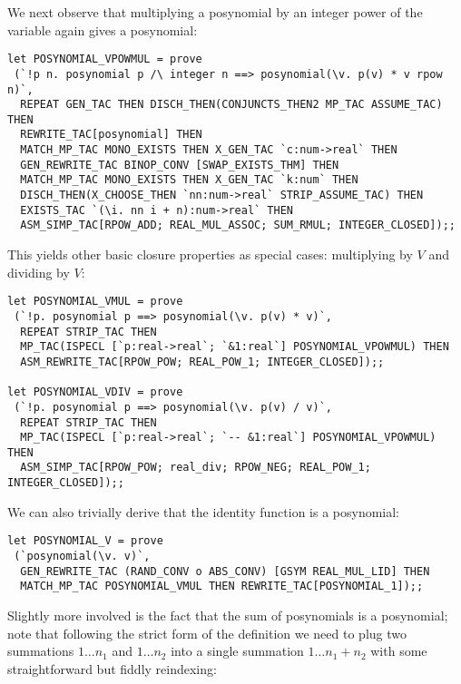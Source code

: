 \documentclass[10pt]{article}
\theoremstyle{definition}
\theoremstyle{remark}
\numberwithin{equation}{section}
\begin{document}
We next observe that multiplying a posynomial by an integer power of the
variable again gives a posynomial:

\begin{scriptsize}\begin{verbatim}
let POSYNOMIAL_VPOWMUL = prove
 (`!p n. posynomial p /\ integer n ==> posynomial(\v. p(v) * v rpow n)`,
  REPEAT GEN_TAC THEN DISCH_THEN(CONJUNCTS_THEN2 MP_TAC ASSUME_TAC) THEN
  REWRITE_TAC[posynomial] THEN
  MATCH_MP_TAC MONO_EXISTS THEN X_GEN_TAC `c:num->real` THEN
  GEN_REWRITE_TAC BINOP_CONV [SWAP_EXISTS_THM] THEN
  MATCH_MP_TAC MONO_EXISTS THEN X_GEN_TAC `k:num` THEN
  DISCH_THEN(X_CHOOSE_THEN `nn:num->real` STRIP_ASSUME_TAC) THEN
  EXISTS_TAC `(\i. nn i + n):num->real` THEN
  ASM_SIMP_TAC[RPOW_ADD; REAL_MUL_ASSOC; SUM_RMUL; INTEGER_CLOSED]);;
\end{verbatim}\end{scriptsize}

This yields other basic closure properties as special cases: multiplying by $V$
and dividing by $V$:

\begin{scriptsize}\begin{verbatim}
let POSYNOMIAL_VMUL = prove
 (`!p. posynomial p ==> posynomial(\v. p(v) * v)`,
  REPEAT STRIP_TAC THEN
  MP_TAC(ISPECL [`p:real->real`; `&1:real`] POSYNOMIAL_VPOWMUL) THEN
  ASM_REWRITE_TAC[RPOW_POW; REAL_POW_1; INTEGER_CLOSED]);;

let POSYNOMIAL_VDIV = prove
 (`!p. posynomial p ==> posynomial(\v. p(v) / v)`,
  REPEAT STRIP_TAC THEN
  MP_TAC(ISPECL [`p:real->real`; `-- &1:real`] POSYNOMIAL_VPOWMUL) THEN
  ASM_SIMP_TAC[RPOW_POW; real_div; RPOW_NEG; REAL_POW_1; INTEGER_CLOSED]);;
\end{verbatim}\end{scriptsize}

We can also trivially derive that the identity function is a posynomial:

\begin{scriptsize}\begin{verbatim}
let POSYNOMIAL_V = prove
 (`posynomial(\v. v)`,
  GEN_REWRITE_TAC (RAND_CONV o ABS_CONV) [GSYM REAL_MUL_LID] THEN
  MATCH_MP_TAC POSYNOMIAL_VMUL THEN REWRITE_TAC[POSYNOMIAL_1]);;
\end{verbatim}\end{scriptsize}

Slightly more involved is the fact that the sum of posynomials is a posynomial;
note that following the strict form of the definition we need to plug two
summations $1 \ldots n_1$ and $1 \ldots n_2$ into a single summation $1 \ldots
n_1 + n_2$ with some straightforward but fiddly reindexing:
\end{document}
